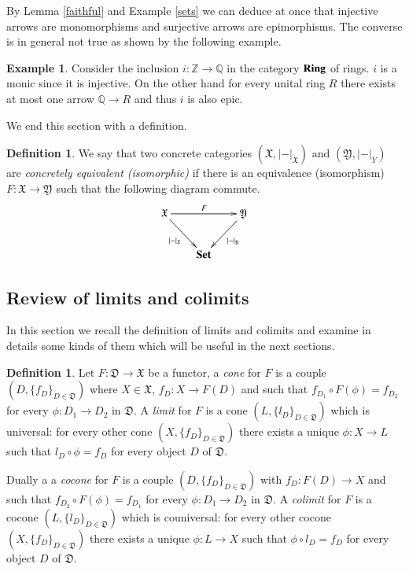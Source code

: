 \documentclass[12pt]{article}
\theoremstyle{definition}
\newtheorem{definition}[lemma]{Definition}
\newtheorem{example}[lemma]{Example}
\def\Z{\mathbb Z}
\def\Q{\mathbb Q}
\def\D{\mathfrak D}
\def\X{\mathfrak X}
\def\Y{\mathfrak Y}
\newcommand{\Set}{\textbf{\textup{Set}}}
\newcommand{\Ring}{\textbf{\textup{Ring}}}
\numberwithin{equation}{section}
\begin{document}
By Lemma \ref{faithful} and Example \ref{sets} we can deduce at once that injective arrows are monomorphisms and surjective arrows are epimorphisms. The converse is in general not true as shown by the following example.

\begin{example}\label{rings}Consider the inclusion $i:\Z\rightarrow \Q$ in the category $\Ring$ of rings. $i$ is a monic since it is injective. On the other hand for every unital ring $R$ there exists at most one arrow $\mathbb{Q}\rightarrow R$ and thus $i$ is also epic.
\end{example}

We end this section with a definition.
\begin{definition}We say that two concrete categories $(\X, |-|_\X)$ and $(\Y, |-|_Y)$ are \emph{concretely equivalent (isomorphic)} if there is an equivalence (isomorphism) $F:\X\rightarrow \Y$ such that the following diagram commute.
\[
\xymatrix@C=20pt{
\X\ar[rr]^{F}\ar[dr]_{|-|_\X}&&\Y\ar[dl]^{|-|_\Y}\\&\Set}
\]


\end{definition}
 
\subsection{Review of limits and colimits} 
 In this section we recall the definition of limits and colimits and examine in details some kinds of them which will be useful in the next sections.
 
 \begin{definition}
 Let $F:\D\rightarrow \X$ be a functor, a \emph{cone} for $F$ is a couple $(D, \{f_D\}_{D\in \D})$ where $X\in \X$, $f_D: X\rightarrow F(D)$ and such that $f_{D_1}\circ F(\phi)=f_{D_2} $ for every $\phi:D_1\rightarrow D_2 $ in $\D$. A \emph{limit} for $F$ is a cone $(L, \{l_D\}_{D\in \D})$ which is universal: for every other cone $(X, \{f_D\}_{D\in \D})$ there exists a unique $\phi:X\rightarrow L$ such that $l_D\circ \phi=f_D$ for every object $D$ of $\D$. 
 
 Dually a a \emph{cocone} for $F$ is a couple $(D, \{f_D\}_{D\in \D})$ with $f_D: F(D)\rightarrow X$ and such that $f_{D_2}\circ F(\phi)=f_{D_1} $ for every $\phi:D_1\rightarrow D_2 $ in $\D$. A \emph{colimit} for $F$ is a cocone $(L, \{l_D\}_{D\in \D})$ which is couniversal: for every other cocone $(X, \{f_D\}_{D\in \D})$ there exists a unique $\phi:L\rightarrow X$ such that $\phi\circ l_D=f_D$ for every object $D$ of $\D$.
 \end{definition}
\end{document}

